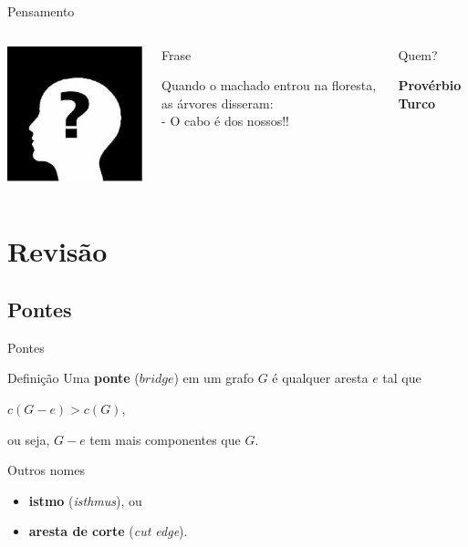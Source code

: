 \documentclass[xcolor=dvipsnames,table]{beamer}
\begin{document}
	\begin{frame}{Pensamento}
		\begin{columns}
		  		\begin{center}
		    		\includegraphics[height=.5\textheight]{images/desconhecido.jpg}
		  		\end{center}
				\begin{block}{Frase}
					\begin{center}
						{\large Quando o machado entrou na floresta, as árvores disseram: \\- O cabo é dos nossos!!}
					\end{center}
				\end{block}		  		
		  		\begin{block}{Quem?}
		  			\begin{center}
						{\bf Provérbio Turco}
					\end{center}
				\end{block}
		\end{columns}
	\end{frame}
    
    \section{Revisão}
    	\subsection{Pontes}
	\begin{frame}{Pontes}
		\begin{block}{Definição}
			Uma {\bf ponte} ($bridge$) em um grafo $G$ é qualquer aresta $e$ tal que 
			\begin{center}
				$c(G - e) > c(G)$,  
			\end{center}
			ou seja, $G - e$ tem mais componentes que $G$.				
		\end{block}
		\begin{block}{Outros nomes}
			\begin{itemize}
				\item {\bf istmo} ({\it isthmus}), ou 
			 	\item {\bf aresta de corte} ({\it cut edge}).
			 \end{itemize}
		\end{block}
	\end{frame}
	
\end{document}
